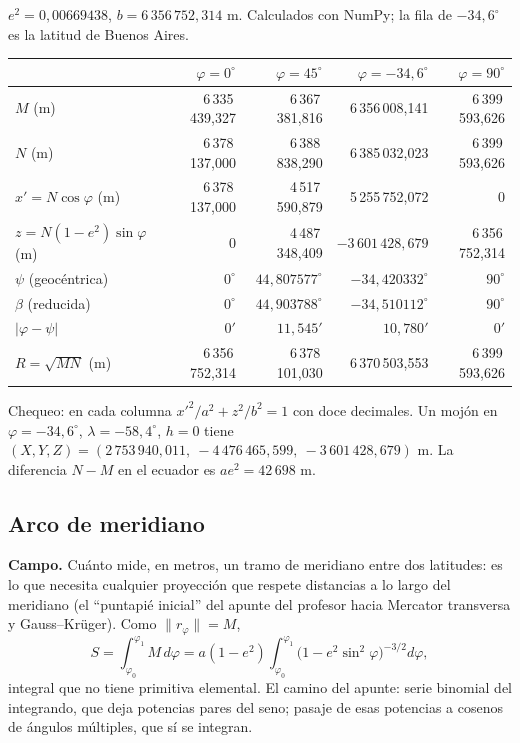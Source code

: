 \begin{resultado}[Valores de control en GRS80 (\(a=6\,378\,137\) m, \(f=1/298{,}257222101\))]
\(e^2=0{,}00669438\), \(b=6\,356\,752{,}314\) m. Calculados con NumPy; la fila de
\(-34{,}6^\circ\) es la latitud de Buenos Aires.

{\small
\begin{center}
\begin{tabular}{l rrrr}
\toprule
 & \(\varphi=0^\circ\) & \(\varphi=45^\circ\) & \(\varphi=-34{,}6^\circ\) & \(\varphi=90^\circ\)\\
\midrule
\(M\) (m) & 6\,335\,439{,}327 & 6\,367\,381{,}816 & 6\,356\,008{,}141 & 6\,399\,593{,}626\\
\(N\) (m) & 6\,378\,137{,}000 & 6\,388\,838{,}290 & 6\,385\,032{,}023 & 6\,399\,593{,}626\\
\(x'=N\cos\varphi\) (m) & 6\,378\,137{,}000 & 4\,517\,590{,}879 & 5\,255\,752{,}072 & 0\\
\(z=N(1-e^2)\sin\varphi\) (m) & 0 & 4\,487\,348{,}409 & \(-3\,601\,428{,}679\) & 6\,356\,752{,}314\\
\(\psi\) (geocéntrica) & \(0^\circ\) & \(44{,}807577^\circ\) & \(-34{,}420332^\circ\) & \(90^\circ\)\\
\(\beta\) (reducida) & \(0^\circ\) & \(44{,}903788^\circ\) & \(-34{,}510112^\circ\) & \(90^\circ\)\\
\(|\varphi-\psi|\) & \(0'\) & \(11{,}545'\) & \(10{,}780'\) & \(0'\)\\
\(R=\sqrt{MN}\) (m) & 6\,356\,752{,}314 & 6\,378\,101{,}030 & 6\,370\,503{,}553 & 6\,399\,593{,}626\\
\bottomrule
\end{tabular}
\end{center}
}

Chequeo: en cada columna \(x'^2/a^2+z^2/b^2=1\) con doce decimales. Un mojón en
\(\varphi=-34{,}6^\circ\), \(\lambda=-58{,}4^\circ\), \(h=0\) tiene
\((X,Y,Z)=(2\,753\,940{,}011,\ -4\,476\,465{,}599,\ -3\,601\,428{,}679)\) m. La diferencia
\(N-M\) en el ecuador es \(ae^2=42\,698\) m.
\end{resultado}

\subsection{Arco de meridiano}\label{sec:arco-meridiano}

\textbf{Campo.} Cuánto mide, en metros, un tramo de meridiano entre dos latitudes: es lo
que necesita cualquier proyección que respete distancias a lo largo del meridiano (el
``puntapié inicial'' del apunte del profesor hacia Mercator transversa y Gauss--Krüger).
Como \(\|r_\varphi\|=M\),
\[
  S=\int_{\varphi_0}^{\varphi_1}M\,d\varphi
  =a(1-e^2)\int_{\varphi_0}^{\varphi_1}\bigl(1-e^2\sin^2\varphi\bigr)^{-3/2}d\varphi ,
\]
integral que no tiene primitiva elemental. El camino del apunte: serie binomial del
integrando, que deja potencias pares del seno; pasaje de esas potencias a cosenos de
ángulos múltiples, que sí se integran.


